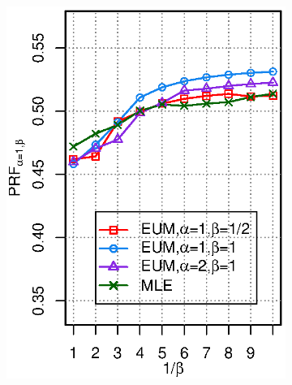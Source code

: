 \begin{figure}[ht!]
\centering
\caption{$P\!R\!F_{\alpha=1,\beta}$ performance for \MLE and \EUM training using \QFI (left) and \QFJ (right) on \DQF. The three \EUM runs use \PRF under different $\alpha,\beta$ settings (specified in the legend) as the training target.}
\label{fig:ll-prf}
\begin{subfigure}[b]{0.45\columnwidth}
\includegraphics[width=\columnwidth]{figure/qf13-qfi-prfaf-ll-prf.eps}
\caption{\QFI}
\end{subfigure}
\begin{subfigure}[b]{0.45\columnwidth}

\end{subfigure}
\end{figure}
